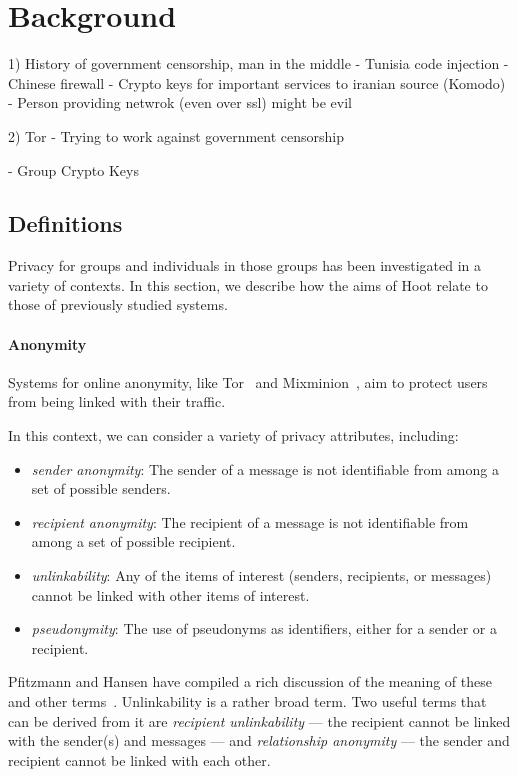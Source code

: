 \section{Background}

1) History of government censorship, man in the middle
	- Tunisia code injection
	- Chinese firewall
	- Crypto keys for important services to iranian source (Komodo)
	- Person providing netwrok (even over ssl) might be evil

2) Tor
	- Trying to work against government censorship
	
- Group Crypto Keys
	

\subsection{Definitions}

Privacy for groups and individuals in those groups has been investigated
in a variety of contexts. In this section, we describe how the aims of
Hoot relate to those of previously studied systems.

\paragraph{Anonymity} 
Systems for online anonymity, like Tor~\cite{tor} and
Mixminion~\cite{mixminion}, aim to protect users from being linked with
their traffic.

In this context, we can consider a variety of privacy attributes,
including:
\begin{itemize}
\item {\em sender anonymity}: The sender of a message is not
  identifiable from among a set of possible senders.
\item {\em recipient anonymity}: The recipient of a message is not
  identifiable from among a set of possible recipient.
\item {\em unlinkability}: Any of the items of interest (senders,
  recipients, or messages) cannot be linked with other items of
  interest.
\item {\em pseudonymity}: The use of pseudonyms as identifiers, either
  for a sender or a recipient.
\end{itemize}
Pfitzmann and Hansen have compiled a rich discussion of the meaning of
these and other terms~\cite{terminology}. Unlinkability is a rather
broad term. Two useful terms that can be derived from it are {\em
  recipient unlinkability} --- the recipient cannot be linked with the
sender(s) and messages --- and {\em relationship anonymity} --- the
sender and recipient cannot be linked with each other.

